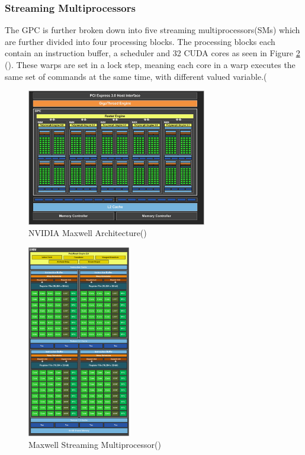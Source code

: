 \subsubsection{Streaming Multiprocessors}\label{gpu:ssec:smm}
The GPC is further broken down into five streaming multiprocessors(SMs) which are further divided into four processing blocks. The processing blocks each contain an instruction buffer, a scheduler and 32 CUDA cores as seen in Figure \ref{gpu:img:smm} (\cite{GM107SMM}). These warps are set in a lock step, meaning each core in a warp executes the same set of commands at the same time, with different valued variable.(\cite{CUDA_DEVKIT}
%
\begin{figure}[H]
 \centering
 \includegraphics[width=0.7\textwidth]{Images/GM107.jpg}
 \caption{NVIDIA Maxwell Architecture(\cite{GM107})}
 \label{gpu:img:gm107}
\end{figure}
%
\begin{figure}[H]
\centering
 \includegraphics[width=0.4\textwidth]{Images/GM107SMM.png}
 \caption{Maxwell Streaming Multiprocessor(\cite{GM107SMM})}
 \label{gpu:img:smm}
\end{figure}
%
